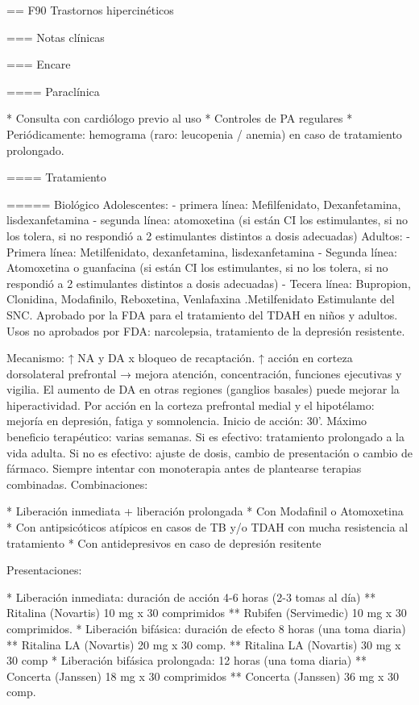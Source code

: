 == F90 Trastornos hipercinéticos

=== Notas clínicas

=== Encare

==== Paraclínica

* Consulta con cardiólogo previo al uso
* Controles de PA regulares
* Periódicamente: hemograma (raro: leucopenia / anemia) en caso de tratamiento prolongado.

==== Tratamiento

===== Biológico
Adolescentes: 
- primera línea: Mefilfenidato, Dexanfetamina, lisdexanfetamina
- segunda línea: atomoxetina (si están CI los estimulantes, si no los tolera, si no respondió a 2 estimulantes distintos a dosis adecuadas)
Adultos:
- Primera línea: Metilfenidato, dexanfetamina, lisdexanfetamina
- Segunda línea: Atomoxetina o guanfacina (si están CI los estimulantes, si no los tolera, si no respondió a 2 estimulantes distintos a dosis adecuadas)
- Tecera línea: Bupropion, Clonidina, Modafinilo, Reboxetina, Venlafaxina
.Metilfenidato
Estimulante del SNC.
Aprobado por la FDA para el tratamiento del TDAH en niños y adultos.
Usos no aprobados por FDA: narcolepsia, tratamiento de la depresión resistente.

Mecanismo: ↑ NA y DA x bloqueo de recaptación. ↑ acción en corteza dorsolateral prefrontal → mejora atención, concentración, funciones ejecutivas y vigilia. El aumento de DA en otras regiones (ganglios basales) puede mejorar la hiperactividad. Por acción en la corteza prefrontal medial y el hipotélamo: mejoría en depresión, fatiga y somnolencia.
Inicio de acción: 30'. Máximo beneficio terapéutico: varias semanas.
Si es efectivo: tratamiento prolongado a la vida adulta.
Si no es efectivo: ajuste de dosis, cambio de presentación o cambio de fármaco.
Siempre intentar con monoterapia antes de plantearse terapias combinadas.
Combinaciones:

* Liberación inmediata + liberación prolongada
* Con Modafinil o Atomoxetina
* Con antipsicóticos atípicos en casos de TB y/o TDAH con mucha resistencia al tratamiento
* Con antidepresivos en caso de depresión resitente

Presentaciones:

* Liberación inmediata: duración de acción 4-6 horas (2-3 tomas al día)
** Ritalina (Novartis) 10 mg x 30 comprimidos
** Rubifen (Servimedic) 10 mg x 30 comprimidos.
* Liberación bifásica: duración de efecto 8 horas (una toma diaria)
** Ritalina LA (Novartis) 20  mg x 30 comp.
** Ritalina LA (Novartis) 30 mg x 30 comp
* Liberación bifásica  prolongada: 12 horas (una toma diaria)
** Concerta (Janssen) 18 mg x 30 comprimidos
** Concerta (Janssen) 36 mg x 30 comp.


